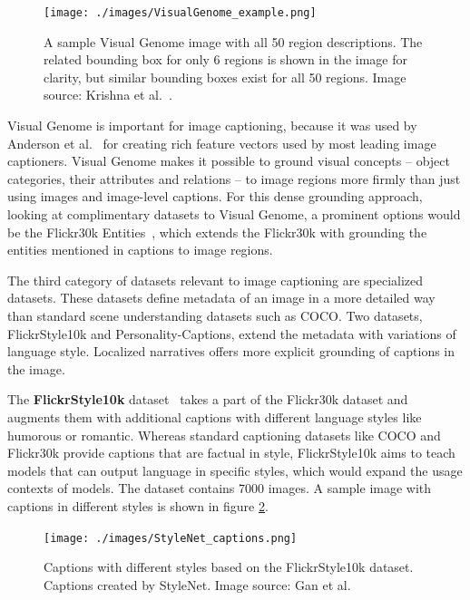 \documentclass[english,twoside,openright]{HYgraduMLDS}
\begin{document}
\begin{figure}[h] 
\centering
\texttt{[image: ./images/VisualGenome\_example.png]}
\caption{A sample Visual Genome image with all 50 region descriptions. The related bounding box for only 6 regions is shown in the image for clarity, but similar bounding boxes exist for all 50 regions. Image source: Krishna et al.~\cite{VisualGenome}.}
\label{fig:VisualGenome_example} 
\end{figure}


Visual Genome is important for image captioning, because it was used by Anderson et al.~\cite{BottomUp} for creating rich feature vectors used by most leading image captioners. Visual Genome makes it possible to ground visual concepts -- object categories, their attributes and relations -- to image regions more firmly than just using images and image-level captions. For this dense grounding approach, looking at complimentary datasets to Visual Genome, a prominent options would be the Flickr30k Entities~\cite{Flickr30kentities}, which extends the Flickr30k with grounding the entities mentioned in captions to image regions.

The third category of datasets relevant to image captioning are specialized datasets. These datasets define metadata of an image in a more detailed way than standard scene understanding datasets such as COCO. Two datasets, FlickrStyle10k and Personality-Captions, extend the metadata with variations of language style. Localized narratives offers more explicit grounding of captions in the image.

The \textbf{FlickrStyle10k} dataset~\cite{StyleNet} takes a part of the Flickr30k dataset and augments them with additional captions with different language styles like humorous or romantic. Whereas standard captioning datasets like COCO and Flickr30k provide captions that are factual in style, FlickrStyle10k aims to teach models that can output language in specific styles, which would expand the usage contexts of models. The dataset contains 7000 images. A sample image with captions in different styles is shown in figure \ref{fig:stylenet_captions}.

\begin{figure}[h] 
\centering
\texttt{[image: ./images/StyleNet\_captions.png]}
\caption{Captions with different styles based on the FlickrStyle10k dataset. Captions created by StyleNet. Image source: Gan et al.~\cite{StyleNet}}
\label{fig:stylenet_captions} 
\end{figure}
\end{document}
